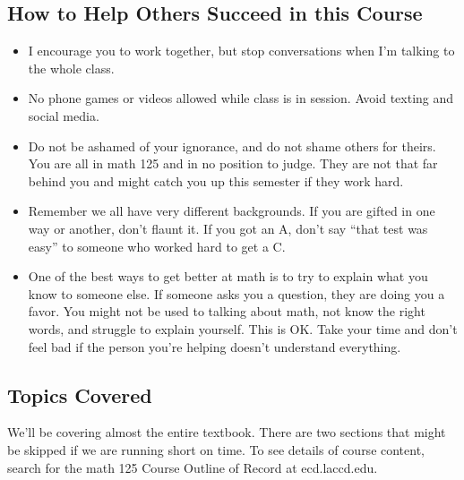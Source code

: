 \documentclass[12pt, twoside]{article}
\begin{document}
\subsection*{How to Help Others Succeed in this Course}
\begin{itemize}
   \item I encourage you to work together, but stop conversations when I'm talking to the whole class.
   \item No phone games or videos allowed while class is in session. Avoid texting and social media. 
   \item Do not be ashamed of your ignorance, and do not shame others for theirs. You are all in math 125 and in no position to judge. They are not that far behind you and might catch you up this semester if they work hard. 
   \item Remember we all have very different backgrounds. If you are gifted in one way or another, don't flaunt it. If you got an A, don't say ``that test was easy'' to someone who worked hard to get a C.
   \item One of the best ways to get better at math is to try to explain what you know to someone else. If someone asks you a question, they are doing you a favor. You might not be used to talking about math, not know the right words, and struggle to explain yourself. This is OK. Take your time and don't feel bad if the person you're helping doesn't understand everything.
\end{itemize}

\subsection*{Topics Covered}

We'll be covering almost the entire textbook. There are two sections that might be skipped if we are running short on time. To see details of course content, search for the math 125 Course Outline of Record at ecd.laccd.edu.
\end{document}
